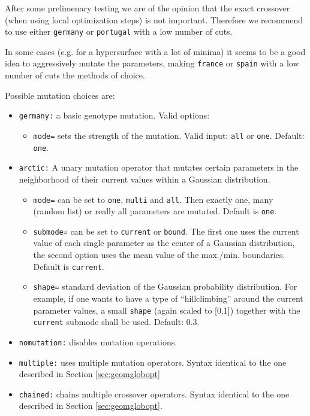 \documentclass[a4paper,10pt]{scrbook}
\begin{document}
After some prelimenary testing we are of the opinion that the exact crossover
(when using local optimization steps) is not important. Therefore we recommend
to use either \texttt{germany} or \texttt{portugal} with a low number of cuts.

In some cases (e.g. for a hypersurface with a lot of minima) it seems to be a
good idea to aggressively mutate the parameters, making \texttt{france} or
\texttt{spain} with a low number of cuts the methods of choice. 

Possible mutation choices are:
\begin{itemize}
  \item \texttt{germany:} a basic genotype mutation. Valid options:
  \begin{itemize}
    \item \texttt{mode=} sets the strength of the mutation. Valid input: 
  \texttt{all} or \texttt{one}. Default: \texttt{one}.
  \end{itemize}
  \item \texttt{arctic:} A unary mutation operator that mutates certain 
  parameters in the neighborhood of their current values within a 
  Gaussian distribution.
  \begin{itemize}
    \item \texttt{mode=} can be set to \texttt{one}, \texttt{multi} and \texttt{all}. 
    Then exactly one, many (random list) or really all parameters are mutated. 
    Default is \texttt{one}.
    \item \texttt{submode=} can be set to \texttt{current} or 
    \texttt{bound}. The first one uses the current value of 
    each single parameter as the center of a Gaussian distribution, 
    the second option uses the mean value of the max./min. boundaries.
    Default is \texttt{current}.
    \item \texttt{shape=} standard deviation of the Gaussian probability 
    distribution. For example, if one wants to have a type of ``hillclimbing''
    around the current parameter values, a small \texttt{shape} (again 
    scaled to [0,1]) together with the \texttt{current} submode shall be used. 
    Default: 0.3.
  \end{itemize}
  \item \texttt{nomutation:} disables mutation operations.
  \item \texttt{multiple:} uses multiple mutation operators. Syntax identical 
to the one described in Section \ref{sec:geomglobopt}
  \item \texttt{chained:} chains multiple crossover operators. Syntax identical 
to the one described in Section \ref{sec:geomglobopt}.
\end{itemize}
\end{document}
